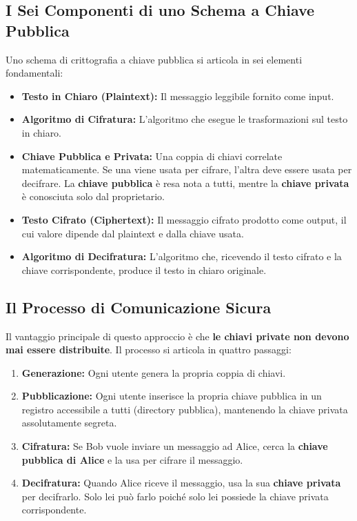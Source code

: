 \subsection{I Sei Componenti di uno Schema a Chiave Pubblica}
Uno schema di crittografia a chiave pubblica si articola in sei elementi fondamentali:

\begin{itemize}
    \item \textbf{Testo in Chiaro (Plaintext):} Il messaggio leggibile fornito come input.
    \item \textbf{Algoritmo di Cifratura:} L'algoritmo che esegue le trasformazioni sul testo in chiaro.
    \item \textbf{Chiave Pubblica e Privata:} Una coppia di chiavi correlate matematicamente. Se una viene usata per cifrare, l'altra deve essere usata per decifrare. La \textbf{chiave pubblica} è resa nota a tutti, mentre la \textbf{chiave privata} è conosciuta solo dal proprietario.
    \item \textbf{Testo Cifrato (Ciphertext):} Il messaggio cifrato prodotto come output, il cui valore dipende dal plaintext e dalla chiave usata.
    \item \textbf{Algoritmo di Decifratura:} L'algoritmo che, ricevendo il testo cifrato e la chiave corrispondente, produce il testo in chiaro originale.
\end{itemize}

\subsection{Il Processo di Comunicazione Sicura}
Il vantaggio principale di questo approccio è che \textbf{le chiavi private non devono mai essere distribuite}. Il processo si articola in quattro passaggi:

\begin{enumerate}
    \item \textbf{Generazione:} Ogni utente genera la propria coppia di chiavi.
    \item \textbf{Pubblicazione:} Ogni utente inserisce la propria chiave pubblica in un registro accessibile a tutti (directory pubblica), mantenendo la chiave privata assolutamente segreta.
    \item \textbf{Cifratura:} Se Bob vuole inviare un messaggio ad Alice, cerca la \textbf{chiave pubblica di Alice} e la usa per cifrare il messaggio.
    \item \textbf{Decifratura:} Quando Alice riceve il messaggio, usa la sua \textbf{chiave privata} per decifrarlo. Solo lei può farlo poiché solo lei possiede la chiave privata corrispondente.
\end{enumerate}

